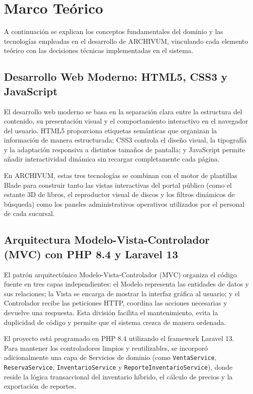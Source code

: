 \chapter{Marco Teórico}
A continuación se explican los conceptos fundamentales del dominio y las tecnologías empleadas en el desarrollo de ARCHIVUM, vinculando cada elemento teórico con las decisiones técnicas implementadas en el sistema.

\section{Desarrollo Web Moderno: HTML5, CSS3 y JavaScript}
El desarrollo web moderno se basa en la separación clara entre la estructura del contenido, su presentación visual y el comportamiento interactivo en el navegador del usuario. HTML5 proporciona etiquetas semánticas que organizan la información de manera estructurada; CSS3 controla el diseño visual, la tipografía y la adaptación responsiva a distintos tamaños de pantalla; y JavaScript permite añadir interactividad dinámica sin recargar completamente cada página.

En ARCHIVUM, estas tres tecnologías se combinan con el motor de plantillas Blade para construir tanto las vistas interactivas del portal público (como el estante 3D de libros, el reproductor visual de discos y los filtros dinámicos de búsqueda) como los paneles administrativos operativos utilizados por el personal de cada sucursal.

\section{Arquitectura Modelo-Vista-Controlador (MVC) con PHP 8.4 y Laravel 13}
El patrón arquitectónico Modelo-Vista-Controlador (MVC) organiza el código fuente en tres capas independientes: el Modelo representa las entidades de datos y sus relaciones; la Vista se encarga de mostrar la interfaz gráfica al usuario; y el Controlador recibe las peticiones HTTP, coordina las acciones necesarias y devuelve una respuesta. Esta división facilita el mantenimiento, evita la duplicidad de código y permite que el sistema crezca de manera ordenada.

El proyecto está programado en PHP 8.4 utilizando el framework Laravel 13. Para mantener los controladores limpios y reutilizables, se incorporó adicionalmente una capa de Servicios de dominio (como \texttt{VentaService}, \texttt{ReservaService}, \texttt{InventarioService} y \texttt{ReporteInventarioService}), donde reside la lógica transaccional del inventario híbrido, el cálculo de precios y la exportación de reportes.

